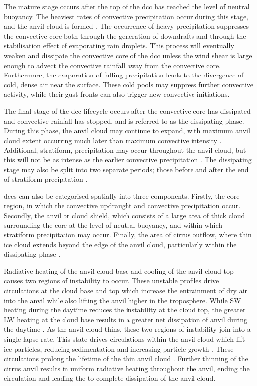 The mature stage occurs after the top of the \acrshort{dcc} has reached the level of neutral buoyancy.
The heaviest rates of convective precipitation occur during this stage, and the anvil cloud is formed \citep{houze_chapter_2014}.
The occurrence of heavy precipitation suppresses the convective core both through the generation of downdrafts and through the stabilisation effect of evaporating rain droplets.
This process will eventually weaken and dissipate the convective core of the \acrshort{dcc} unless the wind shear is large enough to advect the convective rainfall away from the convective core.
Furthermore, the evaporation of falling precipitation leads to the divergence of cold, dense air near the surface.
These cold pools may suppress further convective activity, while their gust fronts can also trigger new convective initiations.

The final stage of the \acrshort{dcc} lifecycle occurs after the convective core has dissipated and convective rainfall has stopped, and is referred to as the dissipating phase.
During this phase, the anvil cloud may continue to expand, with maximum anvil cloud extent occurring much later than maximum convective intensity \citep{futyan_deep_2007}.
Additional, stratiform, precipitation may occur throughout the anvil cloud, but this will not be as intense as the earlier convective precipitation \citep{houze_chapter_2014}.
The dissipating stage may also be split into two separate periods; those before and after the end of stratiform precipitation \citep{wall_life_2018}.

\acrshort{dcc}s can also be categorised spatially into three components.
Firstly, the core region, in which the convective updraught and convective precipitation occur.
Secondly, the anvil or cloud shield, which consists of a large area of thick cloud surrounding the core at the level of neutral buoyancy, and within which stratiform precipitation may occur.
Finally, the area of cirrus outflow, where thin ice cloud extends beyond the edge of the anvil cloud, particularly within the dissipating phase \citep{lilly_cirrus_1988}.

Radiative heating of the anvil cloud base and cooling of the anvil cloud top causes two regions of instability to occur. 
These unstable profiles drive circulations at the cloud base and top which increase the entrainment of dry air into the anvil while also lifting the anvil higher in the troposphere. 
While SW heating during the daytime reduces the instability at the cloud top, the greater LW heating at the cloud base results in a greater net dissipation of anvil during the daytime \citep{sokol_tropical_2020}. 
As the anvil cloud thins, these two regions of instability join into a single lapse rate. 
This state drives circulations within the anvil cloud which lift ice particles, reducing sedimentation and increasing particle growth \citep{gasparini_opinion_2023}. 
These circulations prolong the lifetime of the thin anvil cloud \citep{sokol_tropical_2020}. 
Further thinning of the cirrus anvil results in uniform radiative heating throughout the anvil, ending the circulation and leading the to complete dissipation of the anvil cloud. 


